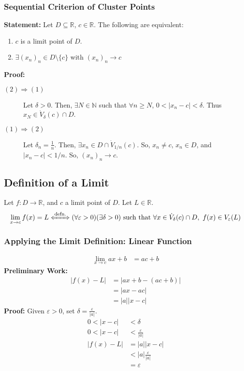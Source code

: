 \documentclass[10pt]{extarticle}
\newcommand{\N}{\mathbb{N}}
\newcommand{\R}{\mathbb{R}}
\begin{document}
    \subsubsection{Sequential Criterion of Cluster Points}%
    \textbf{Statement:} Let $D\subseteq \R$, $c\in\R$. The following are equivalent:
    \begin{enumerate}[(1)]
      \item $c$ is a limit point of $D$.
      \item $\exists (x_n)_n \in D\setminus \{c\}$ with $(x_n)_n \rightarrow c$
    \end{enumerate}
    \textbf{Proof:}
    \begin{description}
      \item[$(2) \Rightarrow (1)$] Let $\delta > 0$. Then, $\exists N\in\N$ such that $\forall n\geq N$, $0 < |x_n - c| < \delta$. Thus $x_{N} \in \dot{V}_{\delta}(c) \cap D$.
      \item[$(1) \Rightarrow (2)$] Let $\delta_n = \frac{1}{n}$. Then, $\exists x_n \in D \cap \dot{V}_{1/n}(c)$. So, $x_n \neq c$, $x_n\in D$, and $|x_n - c| < 1/n$. So, $(x_n)_n \rightarrow c$.
    \end{description}
  \subsection{Definition of a Limit}%
    Let $f: D\rightarrow \R$, and $c$ a limit point of $D$. Let $L \in \R$.
    \begin{align*}
      \lim_{x\rightarrow c} f(x) = L \xLeftrightarrow{\text{defn.}} (\forall \varepsilon > 0)(\exists \delta > 0) \text{ such that } \forall x\in \dot{V}_{\delta}(c)\cap D,~f(x)\in V_{\varepsilon}(L)
    \end{align*}
    \subsubsection{Applying the Limit Definition: Linear Function}%
    \begin{align*}
      \lim_{x\rightarrow c}ax + b &= ac + b \tag*{$a \neq 0$}
    \end{align*}
    \textbf{Preliminary Work:}
    \begin{align*}
      |f(x) - L| &= |ax + b - (ac + b)|\\
                 &= |ax - ac|\\
                 &= |a||x-c|
    \end{align*}
    \textbf{Proof:} Given $\varepsilon > 0$, set $\delta = \frac{\varepsilon}{|a|}$.
    \begin{align*}
      0 < |x-c| &< \delta \\
      0 < |x-c| &< \frac{\varepsilon}{|a|}\\
      |f(x) - L| &= |a| |x-c|\\
                 &< |a| \frac{\varepsilon}{|a|}\\
                &= \varepsilon
    \end{align*}
\end{document}
